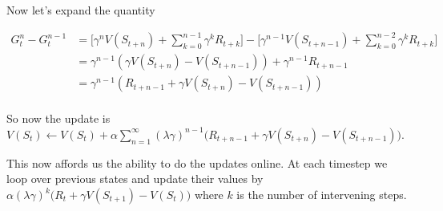 \documentclass[11pt]{article}
\begin{document}
Now let's expand the quantity

\begin{align*}
G^n_t - G^{n-1}_t &= \big[\gamma^n V(S_{t+n}) + \sum_{k=0}^{n - 1} \gamma^k R_{t+k} \big] - \big[\gamma^{n-1} V(S_{t+n-1}) + \sum_{k=0}^{n - 2} \gamma^k R_{t+k} \big] \\
&= \gamma^{n-1} (\gamma V(S_{t + n}) - V(S_{t + n - 1})) + \gamma^{n - 1} R_{t + n - 1}  \\
&= \gamma^{n-1} (R_{t + n - 1} + \gamma V(S_{t + n}) - V(S_{t + n - 1})) \\
\end{align*}

So now the update is $V(S_t) \leftarrow V(S_t) + \alpha \sum_{n=1}^\infty (\lambda\gamma)^{n-1} \big(R_{t + n - 1} + \gamma V(S_{t + n}) - V(S_{t + n - 1})\big)$.

This now affords us the ability to do the updates online.
At each timestep we loop over previous states and update their values by $\alpha(\lambda\gamma)^k \big(R_t + \gamma V(S_{t + 1}) - V(S_t) \big)$ where $k$ is the number
of intervening steps.
\end{document}
